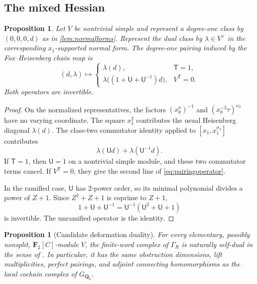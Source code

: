 \documentclass[11pt]{article}
\numberwithin{equation}{section}
\newtheorem{proposition}[theorem]{Proposition}
\theoremstyle{definition}
\theoremstyle{remark}
\newcommand{\Q}{\mathbf Q}
\newcommand{\F}{\mathbf F}
\newcommand{\GQ}{G_{\Q_2}}
\newcommand{\GammaR}{\Gamma_R}
\newcommand{\omegaTwo}{\omega_2}
\begin{document}
\subsection{The mixed Hessian}

\begin{proposition}\label{prop:hessian}
Let \(V\) be nontrivial simple and represent a degree-one class by
\((0,0,0,d)\) as in \cref{lem:normalforms}.  Represent the dual class by
\(\lambda\in V^\vee\) in the corresponding \(x_1\)-supported normal form.
The degree-one pairing induced by the Fox--Heisenberg chain map is
\begin{equation}\label{eq:pairingoperator}
  (d,\lambda)\longmapsto
  \begin{cases}
    \lambda(d),&\mathsf T=1,\\[1mm]
    \lambda\bigl((1+\mathsf U+\mathsf U^{-1})d\bigr),
      &V^{\mathsf T}=0.
  \end{cases}
\end{equation}
Both operators are invertible.
\end{proposition}

\begin{proof}
On the normalized representatives, the factors
\((x_0^\sigma)^{-1}\) and
\((x_0^{-3}\tau)^{\omegaTwo}\) have no varying coordinate.  The square
\(x_1^2\) contributes the usual Heisenberg diagonal \(\lambda(d)\).
The class-two commutator identity applied to
\([x_1,x_1^{\sigma_2}]\) contributes
\[
  \lambda(\mathsf U d)+\lambda(\mathsf U^{-1}d).
\]
If \(\mathsf T=1\), then \(\mathsf U=1\) on a nontrivial simple module,
and these two commutator terms cancel.  If \(V^{\mathsf T}=0\), they give
the second line of \cref{eq:pairingoperator}.

In the ramified case, \(\mathsf U\) has \(2\)-power order, so its minimal
polynomial divides a power of \(Z+1\).  Since
\(Z^2+Z+1\) is coprime to \(Z+1\),
\[
  1+\mathsf U+\mathsf U^{-1}
  =\mathsf U^{-1}(\mathsf U^2+\mathsf U+1)
\]
is invertible.  The unramified operator is the identity.
\end{proof}

\begin{proposition}[Candidate deformation duality]\label{prop:duality}
For every elementary, possibly nonsplit, \(\F_2[C]\)-module \(V\), the
finite-word complex of \(\GammaR\) is naturally self-dual in the sense of
\cite[Proposition~5.15]{RT}.  In particular, it has the same obstruction
dimensions, lift multiplicities, perfect pairings, and adjoint connecting
homomorphisms as the local cochain complex of \(\GQ\).
\end{proposition}
\end{document}
